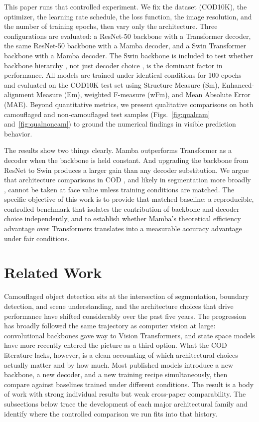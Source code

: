 \documentclass[10pt,conference]{IEEEtran}
\begin{document}
This paper runs that controlled experiment. We fix the dataset (COD10K), the optimizer, the learning rate schedule, the loss function, the image resolution, and the number of training epochs, then vary only the architecture. Three configurations are evaluated: a ResNet-50 backbone with a Transformer decoder, the same ResNet-50 backbone with a Mamba decoder, and a Swin Transformer backbone with a Mamba decoder. The Swin backbone is included to test whether backbone hierarchy , not just decoder choice , is the dominant factor in performance. All models are trained under identical conditions for 100 epochs and evaluated on the COD10K test set using Structure Measure (Sm), Enhanced-alignment Measure (Em), weighted F-measure (wFm), and Mean Absolute Error (MAE). Beyond quantitative metrics, we present qualitative comparisons on both camouflaged and non-camouflaged test samples (Figs.~\ref{fig:qualcam} and~\ref{fig:qualnoncam}) to ground the numerical findings in visible prediction behavior.

The results show two things clearly. Mamba outperforms Transformer as a decoder when the backbone is held constant. And upgrading the backbone from ResNet to Swin produces a larger gain than any decoder substitution. We argue that architecture comparisons in COD , and likely in segmentation more broadly , cannot be taken at face value unless training conditions are matched. The specific objective of this work is to provide that matched baseline: a reproducible, controlled benchmark that isolates the contribution of backbone and decoder choice independently, and to establish whether Mamba's theoretical efficiency advantage over Transformers translates into a measurable accuracy advantage under fair conditions.


\section{Related Work}

Camouflaged object detection sits at the intersection of segmentation, boundary detection, and scene understanding, and the architecture choices that drive performance have shifted considerably over the past five years. The progression has broadly followed the same trajectory as computer vision at large: convolutional backbones gave way to Vision Transformers, and state space models have more recently entered the picture as a third option. What the COD literature lacks, however, is a clean accounting of which architectural choices actually matter and by how much. Most published models introduce a new backbone, a new decoder, and a new training recipe simultaneously, then compare against baselines trained under different conditions. The result is a body of work with strong individual results but weak cross-paper comparability. The subsections below trace the development of each major architectural family and identify where the controlled comparison we run fits into that history.
\end{document}
